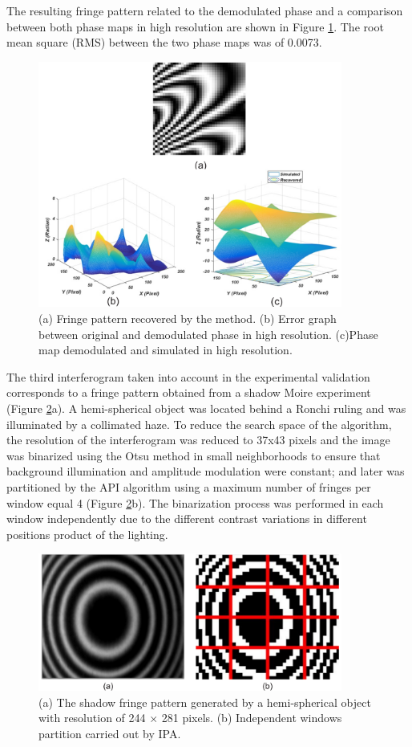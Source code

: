 \documentclass[review]{elsarticle}
\begin{document}
The resulting fringe pattern related to the demodulated phase and a comparison between both phase maps in high resolution are shown in Figure \ref{Fig7}. The root mean square (RMS) between the two phase maps was of 0.0073.
\begin{figure}[ht!]
\centering\includegraphics[width=10cm]{fig7}
\caption{(a) Fringe pattern recovered by the method. (b) Error graph between original and demodulated phase in high resolution. (c)Phase map demodulated and simulated in high resolution.}
\label{Fig7}
\end{figure}

The third interferogram taken into account in the experimental validation corresponds to a fringe pattern obtained from a shadow Moire experiment (Figure \ref{Fig8}a). A hemi-spherical object was located behind a Ronchi ruling and was illuminated by a collimated haze. To reduce the search space of the algorithm, the resolution of the interferogram was reduced to 37x43 pixels and the image was binarized using the Otsu method \cite{1979:ots} in small neighborhoods to ensure that background illumination and amplitude modulation were constant; and later was partitioned by the API algorithm using a maximum number of fringes per window equal 4 (Figure \ref{Fig8}b). The binarization process was performed in each window independently due to the different contrast variations in different positions product of the lighting.

\begin{figure}[ht!]
\centering\includegraphics[width=10cm]{fig8}
\caption{(a) The shadow fringe pattern generated by a hemi-spherical object with resolution of 244 $\times$ 281 pixels. (b) Independent windows partition carried out by IPA.}
\label{Fig8}
\end{figure}
\end{document}
